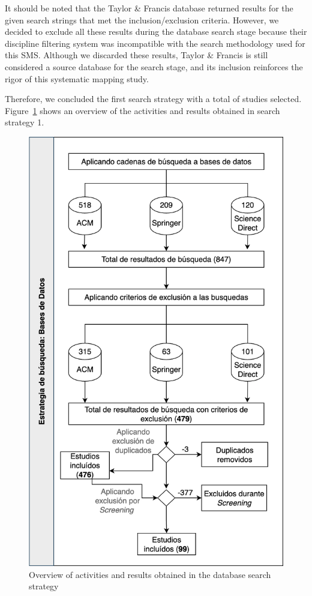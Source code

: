 It should be noted that the Taylor \& Francis database returned results for the given search strings that met the inclusion/exclusion criteria. However, we decided to exclude all these results during the database search stage because their discipline filtering system was incompatible with the search methodology used for this SMS. Although we discarded these results, Taylor \& Francis is still considered a source database for the search stage, and its inclusion reinforces the rigor of this systematic mapping study.


Therefore, we concluded the first search strategy with a total of \screenTot{} studies selected. Figure~\ref{fig:overview} shows an overview of the activities and results obtained in search strategy 1.

\begin{figure}[htbp]
	\centering
	\includegraphics[scale=0.25]{resources/figures/overview.png}
	\caption{Overview of activities and results obtained in the database search strategy}
	\label{fig:overview}
\end{figure}


